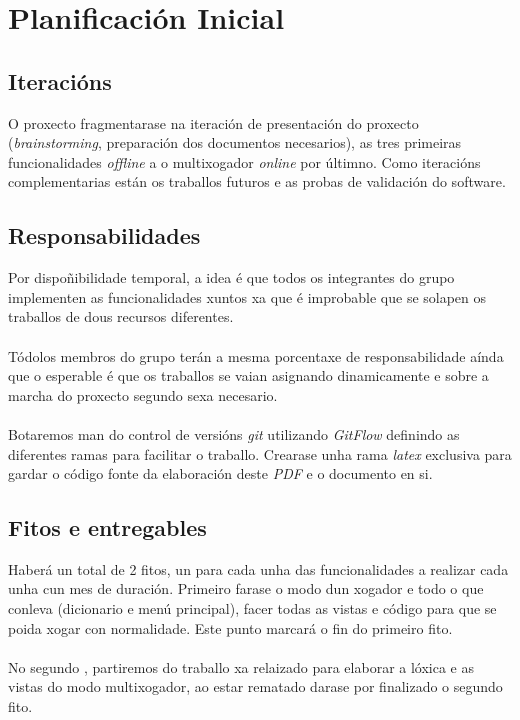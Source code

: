 \chapter{Planificación Inicial}
\label{chap:plan_inicial}

\section{Iteracións}
O proxecto fragmentarase na iteración de presentación do proxecto (\textit{brainstorming}, preparación dos documentos necesarios), as tres primeiras funcionalidades \textit{offline} a o multixogador \textit{online} por últimno. Como iteracións complementarias están os traballos futuros e as probas de validación do software.

\section{Responsabilidades}
Por dispoñibilidade temporal, a idea é que todos os integrantes do grupo implementen as funcionalidades xuntos xa que é improbable que se solapen os traballos de dous recursos diferentes.\\
\\
Tódolos membros do grupo terán a mesma porcentaxe de responsabilidade aínda que o esperable é que os traballos se vaian asignando dinamicamente e sobre a marcha do proxecto segundo sexa necesario.\\
\\
Botaremos man do control de versións \textit{git} utilizando \textit{GitFlow} definindo as diferentes ramas para facilitar o traballo. Crearase unha rama \textit{latex} exclusiva para gardar o código fonte da elaboración deste \textit{PDF} e o documento en si.

\section{Fitos e entregables}
Haberá un total de 2
fitos, un para cada unha das funcionalidades a realizar cada unha cun mes de duración. Primeiro farase o modo dun xogador e todo o que conleva (dicionario e menú principal), facer todas as vistas e código para que se poida xogar con normalidade. Este punto marcará o fin do primeiro fito.\\
\\
No segundo , partiremos do traballo xa relaizado para elaborar a lóxica e as vistas do modo multixogador, ao estar rematado darase por finalizado o segundo fito.


